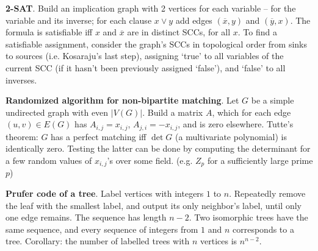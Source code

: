\documentclass[a4paper, 12pt]{article}
\newcommand{\Topic}[1]{\textbf{#1}}
\begin{document}
\Topic{2-SAT}. Build an implication graph with 2 vertices for each
variable -- for the variable and its inverse; for each clause $x \lor y$
add edges $({\overline x}, y)$ and $({\overline y}, x)$.
The formula is satisfiable iff $x$ and ${\overline x}$ are in distinct SCCs,
for all $x$. To find a satisfiable assignment, consider the graph's SCCs
in topological order from sinks to sources (i.e. Kosaraju's last step), assigning `true' to
all variables of the current SCC (if it hasn't been previously
assigned `false'), and `false' to all inverses.

\begin{comment}
\Topic{Bridges and biconnected components}.
\vspace{-3mm}
\begin{verbatim}
int N, counter, seen[MAXN], low[MAXN];  vector<int> stk;

void dfs(int x, int parent) {
    int kids = 0, art = 0;

    low[x] = seen[x] = ++counter;
    stk.push_back(x);

    for each node y adjacent to x do {
        if (y == parent) continue;
        if (seen[y] == 0) {
            dfs(y, x);
            low[x] = min(low[x], low[y]);
            art |= (low[y] >= seen[x]);
            kids++;
            if (low[y] == seen[y]) output "Edge (x, y) is a bridge";
        } else {
            low[x] = min(low[x], seen[y]);
        }
    }

    if ((parent == -1 && kids >= 2) || (parent != -1 && art))
        output "Vertex x is an articulation point";

    if (low[x] == seen[x]) {
        pop all vertices up to x from stack 'stk', and output them
        as a single biconnected component.
    }
}
...
memset(seen, 0, sizeof(seen)); counter = 0; stk.clear(); dfs(..., -1);
\end{verbatim}
\end{comment}

\Topic{Randomized algorithm for non-bipartite matching}.
Let $G$ be a simple undirected graph with even $|V(G)|$.
Build a matrix $A$, which for each edge $(u,v) \in E(G)$ has
$A_{i,j}=x_{i,j}$, $A_{j,i}=-x_{i,j}$, and is zero elsewhere.
Tutte's theorem: $G$ has a perfect matching iff $\det G$ (a multivariate
polynomial) is identically zero.
Testing the latter can be done by computing the determinant for
a few random values of $x_{i,j}$'s over some field.
(e.g. $Z_p$ for a sufficiently large prime $p$)

\Topic{Prufer code of a tree}.
Label vertices with integers $1$ to $n$.
Repeatedly remove the leaf with the smallest label, and output its only
neighbor's label, until only one edge remains. The sequence has
length $n-2$.  Two isomorphic trees have the same sequence, and every sequence
of integers from $1$ and $n$ corresponds to a tree.
Corollary: the number of labelled trees with $n$ vertices is $n^{n-2}$.
\end{document}
